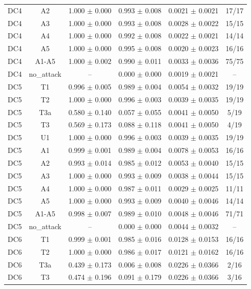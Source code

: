 \begin{tabular}{lccccc}
DC4 & A2 & 1.000 $\pm$ 0.000 & 0.993 $\pm$ 0.008 & 0.0021 $\pm$ 0.0021 & 17/17 \\
DC4 & A3 & 1.000 $\pm$ 0.000 & 0.993 $\pm$ 0.008 & 0.0028 $\pm$ 0.0022 & 15/15 \\
DC4 & A4 & 1.000 $\pm$ 0.000 & 0.992 $\pm$ 0.008 & 0.0022 $\pm$ 0.0021 & 14/14 \\
DC4 & A5 & 1.000 $\pm$ 0.000 & 0.995 $\pm$ 0.008 & 0.0020 $\pm$ 0.0023 & 16/16 \\
DC4 & A1-A5 & 1.000 $\pm$ 0.002 & 0.990 $\pm$ 0.011 & 0.0033 $\pm$ 0.0036 & 75/75 \\
DC4 & no\_attack & -- & 0.000 $\pm$ 0.000 & 0.0019 $\pm$ 0.0021 & -- \\
DC5 & T1 & 0.996 $\pm$ 0.005 & 0.989 $\pm$ 0.004 & 0.0054 $\pm$ 0.0032 & 19/19 \\
DC5 & T2 & 1.000 $\pm$ 0.000 & 0.996 $\pm$ 0.003 & 0.0039 $\pm$ 0.0035 & 19/19 \\
DC5 & T3a & 0.580 $\pm$ 0.140 & 0.057 $\pm$ 0.055 & 0.0041 $\pm$ 0.0050 & 5/19 \\
DC5 & T3 & 0.569 $\pm$ 0.173 & 0.088 $\pm$ 0.118 & 0.0041 $\pm$ 0.0050 & 4/19 \\
DC5 & U1 & 1.000 $\pm$ 0.000 & 0.996 $\pm$ 0.003 & 0.0039 $\pm$ 0.0035 & 19/19 \\
DC5 & A1 & 0.999 $\pm$ 0.001 & 0.989 $\pm$ 0.004 & 0.0078 $\pm$ 0.0053 & 16/16 \\
DC5 & A2 & 0.993 $\pm$ 0.014 & 0.985 $\pm$ 0.012 & 0.0053 $\pm$ 0.0040 & 15/15 \\
DC5 & A3 & 1.000 $\pm$ 0.000 & 0.993 $\pm$ 0.009 & 0.0038 $\pm$ 0.0044 & 15/15 \\
DC5 & A4 & 1.000 $\pm$ 0.000 & 0.987 $\pm$ 0.011 & 0.0029 $\pm$ 0.0025 & 11/11 \\
DC5 & A5 & 1.000 $\pm$ 0.000 & 0.993 $\pm$ 0.009 & 0.0040 $\pm$ 0.0046 & 14/14 \\
DC5 & A1-A5 & 0.998 $\pm$ 0.007 & 0.989 $\pm$ 0.010 & 0.0048 $\pm$ 0.0046 & 71/71 \\
DC5 & no\_attack & -- & 0.000 $\pm$ 0.000 & 0.0044 $\pm$ 0.0032 & -- \\
DC6 & T1 & 0.999 $\pm$ 0.001 & 0.985 $\pm$ 0.016 & 0.0128 $\pm$ 0.0153 & 16/16 \\
DC6 & T2 & 1.000 $\pm$ 0.000 & 0.986 $\pm$ 0.017 & 0.0121 $\pm$ 0.0162 & 16/16 \\
DC6 & T3a & 0.439 $\pm$ 0.173 & 0.006 $\pm$ 0.008 & 0.0226 $\pm$ 0.0366 & 2/16 \\
DC6 & T3 & 0.474 $\pm$ 0.196 & 0.091 $\pm$ 0.179 & 0.0226 $\pm$ 0.0366 & 3/16 \\

\end{tabular}
